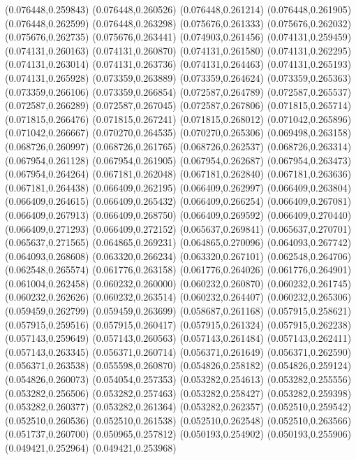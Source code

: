 (0.076448,0.259843)
(0.076448,0.260526)
(0.076448,0.261214)
(0.076448,0.261905)
(0.076448,0.262599)
(0.076448,0.263298)
(0.075676,0.261333)
(0.075676,0.262032)
(0.075676,0.262735)
(0.075676,0.263441)
(0.074903,0.261456)
(0.074131,0.259459)
(0.074131,0.260163)
(0.074131,0.260870)
(0.074131,0.261580)
(0.074131,0.262295)
(0.074131,0.263014)
(0.074131,0.263736)
(0.074131,0.264463)
(0.074131,0.265193)
(0.074131,0.265928)
(0.073359,0.263889)
(0.073359,0.264624)
(0.073359,0.265363)
(0.073359,0.266106)
(0.073359,0.266854)
(0.072587,0.264789)
(0.072587,0.265537)
(0.072587,0.266289)
(0.072587,0.267045)
(0.072587,0.267806)
(0.071815,0.265714)
(0.071815,0.266476)
(0.071815,0.267241)
(0.071815,0.268012)
(0.071042,0.265896)
(0.071042,0.266667)
(0.070270,0.264535)
(0.070270,0.265306)
(0.069498,0.263158)
(0.068726,0.260997)
(0.068726,0.261765)
(0.068726,0.262537)
(0.068726,0.263314)
(0.067954,0.261128)
(0.067954,0.261905)
(0.067954,0.262687)
(0.067954,0.263473)
(0.067954,0.264264)
(0.067181,0.262048)
(0.067181,0.262840)
(0.067181,0.263636)
(0.067181,0.264438)
(0.066409,0.262195)
(0.066409,0.262997)
(0.066409,0.263804)
(0.066409,0.264615)
(0.066409,0.265432)
(0.066409,0.266254)
(0.066409,0.267081)
(0.066409,0.267913)
(0.066409,0.268750)
(0.066409,0.269592)
(0.066409,0.270440)
(0.066409,0.271293)
(0.066409,0.272152)
(0.065637,0.269841)
(0.065637,0.270701)
(0.065637,0.271565)
(0.064865,0.269231)
(0.064865,0.270096)
(0.064093,0.267742)
(0.064093,0.268608)
(0.063320,0.266234)
(0.063320,0.267101)
(0.062548,0.264706)
(0.062548,0.265574)
(0.061776,0.263158)
(0.061776,0.264026)
(0.061776,0.264901)
(0.061004,0.262458)
(0.060232,0.260000)
(0.060232,0.260870)
(0.060232,0.261745)
(0.060232,0.262626)
(0.060232,0.263514)
(0.060232,0.264407)
(0.060232,0.265306)
(0.059459,0.262799)
(0.059459,0.263699)
(0.058687,0.261168)
(0.057915,0.258621)
(0.057915,0.259516)
(0.057915,0.260417)
(0.057915,0.261324)
(0.057915,0.262238)
(0.057143,0.259649)
(0.057143,0.260563)
(0.057143,0.261484)
(0.057143,0.262411)
(0.057143,0.263345)
(0.056371,0.260714)
(0.056371,0.261649)
(0.056371,0.262590)
(0.056371,0.263538)
(0.055598,0.260870)
(0.054826,0.258182)
(0.054826,0.259124)
(0.054826,0.260073)
(0.054054,0.257353)
(0.053282,0.254613)
(0.053282,0.255556)
(0.053282,0.256506)
(0.053282,0.257463)
(0.053282,0.258427)
(0.053282,0.259398)
(0.053282,0.260377)
(0.053282,0.261364)
(0.053282,0.262357)
(0.052510,0.259542)
(0.052510,0.260536)
(0.052510,0.261538)
(0.052510,0.262548)
(0.052510,0.263566)
(0.051737,0.260700)
(0.050965,0.257812)
(0.050193,0.254902)
(0.050193,0.255906)
(0.049421,0.252964)
(0.049421,0.253968)

